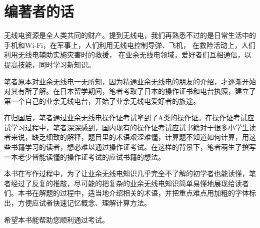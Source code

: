 \chapter*{编著者的话}

无线电资源是全人类共同的财产。提到无线电，我们再熟悉不过的是日常生活中的手机和Wi-Fi，在军事上，人们利用无线电控制导弹、飞机，%
在救险活动上，人们利用无线电辅助实施灾害时的救援，%
在业余无线电领域，爱好者们互相通信，以提高技能，同时学习新知识。

笔者原本对业余无线电一无所知，因为精通业余无线电的朋友的介绍，才逐渐开始对其有所了解。在日本留学期间，笔者考取了日本的操作证书和电台执照，建立了第一个自己的业余无线电台，开始了业余无线电爱好者的旅途。

在归国后，笔者通过业余无线电操作证考试拿到了A类的操作证。在操作证考试应试学习过程中，笔者深深感到，国内现有的操作证考试应试书籍对于很多小学生读者来说，缺乏细致的解释，题目里的术语艰涩难懂，计算题不知道如何计算，用这些书籍学习的读者，想必难以通过操作证考试。在这样的背景下，笔者萌生了撰写一本老少皆能读懂的操作证考试的应试书籍的想法。

本书在写作过程中，为了让业余无线电知识几乎完全不了解的初学者也能读懂，笔者经过了反复的推敲，尽可能的把复杂的业余无线电知识简单易懂地展现给读者们。本书在解题的过程中，适当地介绍相关的术语，并把重点难点用加粗的字体标出，方便应试者快速记忆概念、理解计算方法。

希望本书能帮助您顺利通过考试。


